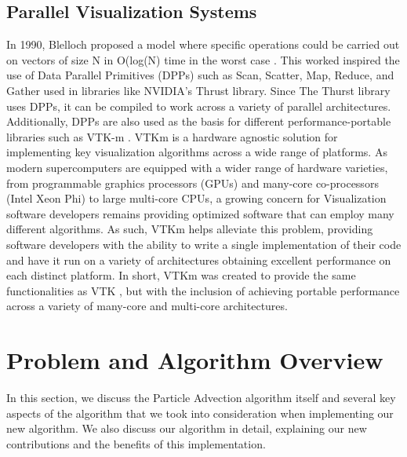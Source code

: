 \documentclass{IEEEtran}
\begin{document}
\subsection{Parallel Visualization Systems}
In 1990, Blelloch proposed a model where specific operations could be carried out on vectors of size N in O(log(N) time in the worst case \cite{Blelloch}.
%
This worked inspired the use of Data Parallel Primitives (DPPs) such as Scan, Scatter, Map, Reduce, and Gather used in libraries like NVIDIA's Thrust \cite{Thrust} library.
%
Since The Thurst library uses DPPs, it can be compiled to work across a variety of parallel architectures.
%
Additionally, DPPs are also used as the basis for different performance-portable libraries such as VTK-m \cite{Moreland16}.
%
VTKm is a hardware agnostic solution for implementing key visualization algorithms across a wide range of platforms.
%
As modern supercomputers are equipped with a wider range of hardware varieties, from programmable graphics processors (GPUs) and many-core co-processors (Intel Xeon Phi) to large multi-core CPUs, a growing concern for Visualization software developers remains providing optimized software that can employ many different algorithms.
%
As such, VTKm helps alleviate this problem, providing software developers with the ability to write a single implementation of their code and have it run on a variety of architectures obtaining excellent performance on each distinct platform.
%
In short, VTKm was created to provide the same functionalities as VTK \cite{vtk}, but with the inclusion of achieving portable performance across a variety of many-core and multi-core architectures.
%
%
%
%
%
%
\section{Problem and Algorithm Overview}
In this section, we discuss the Particle Advection algorithm itself and several key aspects of the algorithm that we took into consideration when implementing our new algorithm. 
%
We also discuss our algorithm in detail, explaining our new contributions and the benefits of this implementation.
%
\end{document}
